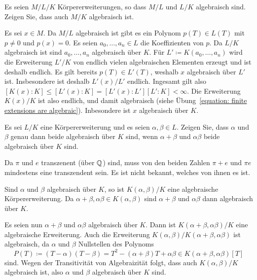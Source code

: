 \begin{question}
  Es seien $M / L / K$ Körpererweiterungen, so dass $M/L$ und $L/K$ algebraisch sind.
  Zeigen Sie, dass auch $M/K$ algebraisch ist.
\end{question}


\begin{question}
  Es sei $x \in M$.
  Da $M/L$ algebraisch ist gibt es ein Polynom $p(T) \in L(T)$ mit $p \neq 0$ und $p(x) = 0$.
  Es seien $a_0, \dotsc, a_n \in L$ die Koeffizienten von $p$.
  Da $L/K$ algebraisch ist sind $a_0, \dotsc, a_n$ algebraisch über $K$.
  Für $L' \coloneqq K(a_0, \dotsc, a_n)$ wird die Erweiterung $L'/K$ von endlich vielen algebraischen Elementen erzeugt und ist deshalb endlich.
  Es gilt bereits $p(T) \in L'(T)$, weshalb $x$ algebraisch über $L'$ ist.
  Insbesondere ist deshalb $L'(x)/L'$ endlich.
  Ingesamt gilt also $[K(x) : K] \leq [L'(x) : K] = [L'(x) : L'][L' : K] < \infty$.
  Die Erweiterung $K(x)/K$ ist also endlich, und damit algebraisch (siehe Übung~\ref{equation: finite extensions are algebraic}).
  Inbesondere ist $x$ algebraisch über $K$.
\end{question}


\begin{question}
  Es sei $L/K$ eine Körpererweiterung und es seien $\alpha, \beta \in L$.
  Zeigen Sie, dass $\alpha$ und $\beta$ genau dann beide algebraisch über $K$ sind, wenn $\alpha + \beta$ und $\alpha \beta$ beide algebraisch über $K$ sind.
\end{question}


\begin{remark*}
  Da $\pi$ und $e$ transzenent (über $\mathbb{Q}$) sind, muss von den beiden Zahlen $\pi + e$ und $\pi e$ mindestens eine transzendent sein.
  Es ist nicht bekannt, welches von ihnen es ist.
\end{remark*}


\begin{solution}
  Sind $\alpha$ und $\beta$ algebraisch über $K$, so ist $K(\alpha, \beta) / K$ eine algebraische Körpererweiterung.
  Da $\alpha + \beta, \alpha \beta \in K(\alpha, \beta)$ sind $\alpha + \beta$ und $\alpha \beta$ dann algebraisch über $K$.
  
  Es seien nun $\alpha + \beta$ und $\alpha \beta$ algebraisch über $K$.
  Dann ist $K(\alpha + \beta, \alpha \beta)/K$ eine algebraische Erweiterung.
  Auch die Erweiterung $K(\alpha, \beta)/K(\alpha + \beta, \alpha \beta)$ ist algebraisch, da $\alpha$ und $\beta$ Nullstellen des Polynoms
  \[
              P(T)
    \coloneqq (T - \alpha)(T - \beta)
    =         T^2 - (\alpha + \beta)T + \alpha \beta
    \in       K(\alpha + \beta, \alpha \beta)[T]
  \]
  sind.
  Wegen der Transitivität von Algebraizität folgt, dass auch $K(\alpha,\beta)/K$ algebraisch ist, also $\alpha$ und $\beta$ algebraisch über $K$ sind.
\end{solution}


